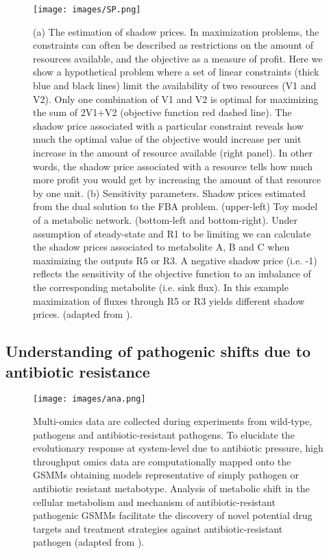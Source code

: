 \documentclass{article}
\begin{document}
\begin{figure}
\centering
\texttt{[image: images/SP.png]}
\caption{\label{fig:SP} (a) The estimation of shadow prices. In maximization problems, the constraints can often be described as restrictions on the amount of resources available, and the objective as a  measure of profit. Here we show a hypothetical problem where a set of linear constraints (thick blue and black lines) limit the availability of two resources (V1 and V2). Only one combination of  V1 and V2 is optimal for maximizing the sum of 2V1+V2 (objective function red dashed line). The shadow price associated with a particular constraint reveals how much the optimal value of the objective would increase per unit increase in the amount of resource available (right panel). In other words, the shadow price associated with a resource  tells how much more profit you would get by increasing the amount of that resource by one unit. (b) Sensitivity parameters. Shadow prices estimated from the dual solution to the FBA problem. (upper-left) Toy model of a metabolic network. (bottom-left and bottom-right). Under assumption of steady-state and R1 to be limiting we can calculate the shadow prices associated to metabolite A, B and C when maximizing the outputs R5 or R3. A negative shadow price (i.e. -1) reflects the sensitivity of the objective function to an imbalance of the corresponding metabolite (i.e. sink flux). In this example maximization of fluxes through R5 or R3 yields different shadow prices. (adapted from \cite{Zampieri}).}
\end{figure}

\subsection{Understanding of pathogenic shifts due to antibiotic resistance}

\begin{figure}
\centering
\texttt{[image: images/ana.png]}
\caption{\label{fig:ana} Multi-omics data are collected during experiments from wild-type, pathogens and antibiotic-resistant pathogens. To elucidate the evolutionary response at system-level due to antibiotic pressure, high throughput omics data are computationally mapped onto the GSMMs obtaining models representative of simply pathogen or antibiotic resistant metabotype. Analysis of metabolic shift in the cellular metabolism and mechanism of antibiotic-resistant pathogenic GSMMs facilitate the discovery of novel potential drug targets and treatment strategies against antibiotic-resistant pathogen (adapted from \cite{Sertbas}).}
\end{figure}
\end{document}
